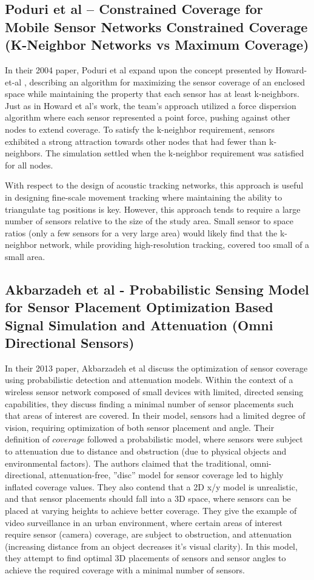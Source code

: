 \subsection{Poduri et al – Constrained Coverage for Mobile Sensor Networks Constrained Coverage (K-Neighbor Networks vs Maximum Coverage)}
In their 2004 paper, Poduri et al\cite{Poduri2004} expand upon the concept presented by Howard-et-al \cite{Howard2002}, describing an algorithm for maximizing the sensor coverage of an enclosed space while maintaining the property that each sensor has at least k-neighbors. Just as in Howard et al's work, the team's approach utilized a force dispersion algorithm where each sensor represented a point force, pushing against other nodes to extend coverage.  To satisfy the k-neighbor requirement, sensors exhibited a strong attraction towards other nodes that had fewer than k-neighbors.  The simulation settled when the k-neighbor requirement was satisfied for all nodes.  

With respect to the design of acoustic tracking networks, this approach is useful in designing fine-scale movement tracking where maintaining the ability to triangulate tag positions is key.  However, this approach tends to require a large number of sensors relative to the size of the study area.  Small sensor to space ratios (only a few sensors for a very large area) would likely find that the k-neighbor network, while providing high-resolution tracking, covered too small of a small area.

\subsection{Akbarzadeh et al - Probabilistic Sensing Model for Sensor Placement Optimization Based Signal Simulation and Attenuation (Omni Directional Sensors)}
In their 2013 paper, Akbarzadeh et al\cite{Akbarzadeh2013} discuss the optimization of sensor coverage using probabilistic detection and attenuation models.  Within the context of a wireless sensor network composed of small devices with limited, directed sensing capabilities, they discuss finding a minimal number of sensor placements such that areas of interest are covered.  In their model, sensors had a limited degree of vision, requiring optimization of both sensor placement and angle.  Their definition of $coverage$ followed a probabilistic model, where sensors were subject to attenuation due to distance and obstruction (due to physical objects and environmental factors).  The authors claimed that the traditional, omni-directional, attenuation-free, ''disc'' model for sensor coverage led to highly inflated coverage values.  They also contend that a 2D x/y model is unrealistic, and that sensor placements should fall into a 3D space, where sensors can be placed at varying heights to achieve better coverage.  They give the example of video surveillance in an urban environment, where certain areas of interest require sensor (camera) coverage, are subject to obstruction, and attenuation (increasing distance from an object decreases it's visual clarity).  In this model, they attempt to find optimal 3D placements of sensors and sensor angles to achieve the required coverage with a minimal number of sensors. 

